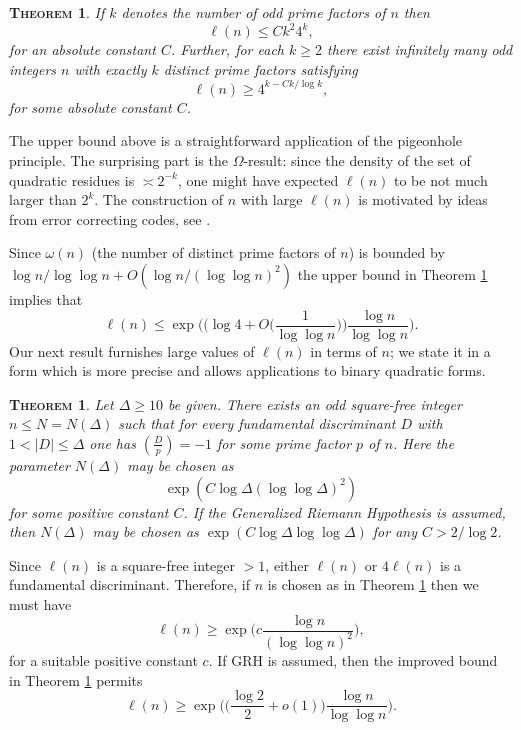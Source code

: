 \documentclass[11pt,makeidx, reqno]{amsart}
\theoremstyle{mystyle}
\newtheorem{thm}[theorem]{\textsc{Theorem}}
\theoremstyle{definition}
\begin{document}
 
 \begin{thm}\label{thm1.1}  If $k$ denotes the number of odd prime factors of $n$ then 
    \[
    \ell(n) \le Ck^2 4^k,
    \]
    for an absolute constant $C$.  Further, for each $k\ge 2$ there exist infinitely many odd integers $n$ with exactly $k$ distinct prime factors satisfying 
    \[
    \ell(n) \ge 4^{k- Ck/\log k},
    \]
    for some absolute constant $C$.  
\end{thm}


The upper bound above is a straightforward application of the pigeonhole principle.  The surprising part is the $\Omega$-result: since the density of the set of quadratic residues is $\asymp 2^{-k}$, one might have expected $\ell(n)$ to be not much larger than $2^k$.   The construction of $n$ with large $\ell(n)$ is motivated by ideas from error correcting codes, see \cite{boseClass, hocquenghenCodes}.   


Since $\omega(n)$ (the number of distinct prime factors of $n$) is bounded by $\log n/\log \log n + O(\log n/(\log \log n)^2)$ the upper bound in Theorem \ref{thm1.1} implies that 
\begin{equation} \label{1.2}
\ell(n) \le \exp\Big( \Big( \log 4 +O\Big(\frac{1}{\log \log n}\Big) \Big)\frac{\log n}{\log \log n}\Big). 
\end{equation}
Our next result furnishes large values of $\ell(n)$ in terms of $n$; we state it in a form which is more precise and allows applications to binary quadratic forms.


\begin{thm}\label{thm1.2}  Let $\Delta \ge 10$ be given.   There exists an odd square-free integer $n\le N=N(\Delta)$ such that for every fundamental discriminant $D$ with $1 < |D|\le \Delta$ one has $(\frac{D}{p})=-1$ for some prime factor $p$ of $n$.   Here the parameter $N(\Delta)$ may be chosen as 
$$\exp(C \log \Delta (\log \log \Delta)^2)$$ 
for some positive constant $C$.  If the Generalized Riemann Hypothesis is assumed, then $N(\Delta)$ may be chosen as $\exp(C\log \Delta \log \log  \Delta)$ for any $C> 2/\log 2$.  
\end{thm}

Since $\ell(n)$ is a square-free integer $>1$, either $\ell(n)$ or $4\ell(n)$ is a fundamental discriminant.  Therefore, if $n$ is chosen as in Theorem \ref{thm1.2} then we must have 
$$  
\ell(n) \ge \exp\Big( c \frac{\log n}{(\log \log n)^2} \Big), 
$$
for a suitable positive constant $c$.   If GRH is assumed, then the improved bound in Theorem \ref{thm1.2} permits 
$$
\ell(n) \ge \exp\Big( \Big(\frac{\log 2}{2}+ o(1)\Big) \frac{\log n}{\log \log n} \Big). 
$$
   
\end{document}
